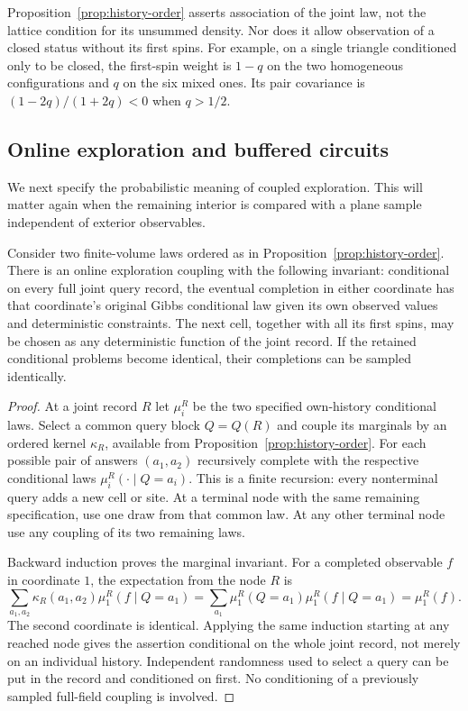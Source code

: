 \begin{remark}\label{discrete:not-raw-FKG}
Proposition~\ref{prop:history-order} asserts association of the joint law,
not the lattice condition for its unsummed density. Nor does it allow
observation of a closed status without its first spins. For example, on a
single triangle conditioned only to be closed, the first-spin weight is
$1-q$ on the two homogeneous configurations and $q$ on the six mixed
ones. Its pair covariance is $(1-2q)/(1+2q)<0$ when $q>1/2$.
\end{remark}

\subsection{Online exploration and buffered circuits}

We next specify the probabilistic meaning of coupled exploration. This
will matter again when the remaining interior is compared with a plane
sample independent of exterior observables.

\begin{lemma}\label{discrete:online}
Consider two finite-volume laws ordered as in
Proposition~\ref{prop:history-order}. There is an online exploration
coupling with the following invariant: conditional on every full joint
query record, the eventual completion in either coordinate has that
coordinate's original Gibbs conditional law given its own observed values
and deterministic constraints. The next cell, together with all its first
spins, may be chosen as any deterministic function of the joint record.
If the retained conditional problems become identical, their completions
can be sampled identically.
\end{lemma}
\begin{proof}
At a joint record $R$ let $\mu_i^R$ be the two specified own-history
conditional laws. Select a common query block $Q=Q(R)$ and couple its
marginals by an ordered kernel $\kappa_R$, available from
Proposition~\ref{prop:history-order}. For each possible pair of answers
$(a_1,a_2)$ recursively complete with the respective conditional laws
$\mu_i^R(\cdot\mid Q=a_i)$. This is a finite recursion: every nonterminal
query adds a new cell or site. At a terminal node with the same remaining
specification, use one draw from that common law. At any other terminal
node use any coupling of its two remaining laws.

Backward induction proves the marginal invariant. For a completed
observable $f$ in coordinate $1$, the expectation from the node $R$ is
\[
 \sum_{a_1,a_2}\kappa_R(a_1,a_2)
       \mu_1^R(f\mid Q=a_1)
 =\sum_{a_1}\mu_1^R(Q=a_1)\mu_1^R(f\mid Q=a_1)
 =\mu_1^R(f).
\]
The second coordinate is identical. Applying the same induction starting
at any reached node gives the assertion conditional on the whole joint
record, not merely on an individual history. Independent randomness used
to select a query can be put in the record and conditioned on first.
No conditioning of a previously sampled full-field coupling is involved.
\end{proof}

